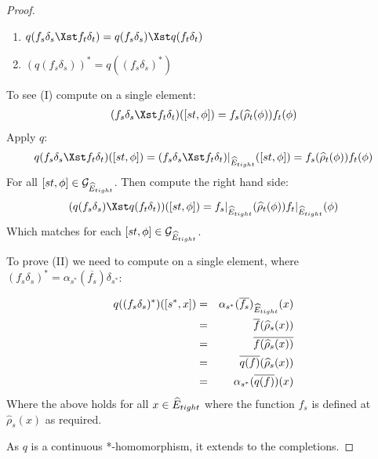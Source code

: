 \begin{corollary}
\begin{proof}
\begin{enumerate}[I]
\item $q(f_{s}\delta_{s} \Xst f_{t}\delta_{t}) = q(f_{s}\delta_{s})\Xst q(f_{t}\delta_{t})$
\item $(q(f_{s}\delta_{s}))^{*}=q((f_{s}\delta_{s})^{*})$
\end{enumerate}


To see (I) compute on a single element:
\begin{eqnarray*}
(f_{s}\delta_{s} \Xst f_{t}\delta_{t})([st,\phi])=f_{s}(\widehat{\rho}_{t}(\phi))f_{t}(\phi)
\end{eqnarray*}
Apply $q$:
\begin{eqnarray*}
q(f_{s}\delta_{s} \Xst f_{t}\delta_{t})([st,\phi])= (f_{s}\delta_{s} \Xst f_{t}\delta_{t})|_{\E_{tight}}([st,\phi]) =f_{s}(\widehat{\rho}_{t}(\phi))f_{t}(\phi)
\end{eqnarray*}
For all $[st,\phi] \in \mathcal{G}_{\widehat{E}_{tight}}$. Then compute the right hand side: 
\begin{eqnarray*}
(q(f_{s}\delta_{s}) \Xst q(f_{t}\delta_{t}))([st,\phi])=f_{s}|_{\E_{tight}}(\widehat{\rho}_{t}(\phi))f_{t}|_{\E_{tight}}(\phi)
\end{eqnarray*}
Which matches for each $[st,\phi] \in \mathcal{G}_{\widehat{E}_{tight}}$. 

To prove (II) we need to compute on a single element, where $(f_{s}\delta_{s})^{*}=\alpha_{s^{*}}(\overline{f_{s}})\delta_{s^{*}}$:

\begin{eqnarray*}
q((f_{s}\delta_{s})^{*})([s^{*},x])& = &\alpha_{s^{*}}(\overline{f_{s}})_{\widehat{E}_{tight}}(x)\\
& = & \overline{f}(\widehat{\rho}_{s}(x)) \\ & = & \overline{f(\widehat{\rho}_{s}(x))} \\ & = & \overline{q(f)}(\widehat{\rho}_{s}(x)) \\ & = &  \alpha_{s^{*}}(\overline{q(f)})(x)
\end{eqnarray*}
Where the above holds for all $x \in \widehat{E}_{tight}$ where the function $f_{s}$ is defined at $\widehat{\rho}_{s}(x)$ as required.

As $q$ is a continuous *-homomorphism, it extends to the completions.
\end{proof}


\end{corollary}
